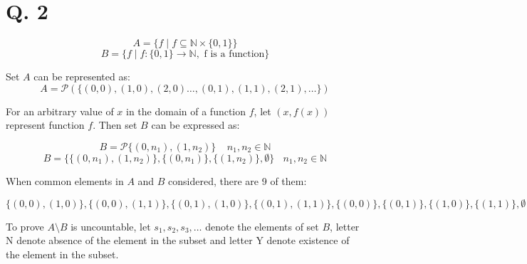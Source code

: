 \documentclass[11pt]{article}
\begin{document}
	\section*{Q. 2}
	\begin{equation*}
		A=\{f \mid f \subseteq  \mathbb{N} \times \{0,1 \} \}
	\end{equation*}
	\begin{equation*}
		B=\{f \mid f :  \{0,1 \} \rightarrow \mathbb{N}, \text{ f is a function} \}
	\end{equation*}

	Set $A$ can be represented as:
	\begin{equation*}
		A=\mathcal{P} (\{ (0, 0), (1, 0), (2,0) \dots, (0, 1), (1, 1), (2,1), \dots \})
	\end{equation*}

	For an arbitrary value of $x$ in the domain of a function $f$, let $(x, f(x))$ represent function $f$. Then set $B$ can be expressed as:
	
	\begin{equation*}
		B=\mathcal{P}\{ (0, n_1), (1, n_2)\} \ \ \ \ \ \text{$n_1, n_2 \in \mathbb{N}$}
	\end{equation*} 
	\begin{equation*}
		B=\{\{ (0, n_1), (1, n_2) \}, \{ (0, n_1) \}, \{ (1, n_2) \}, \emptyset \} \ \ \ \ \text{$n_1, n_2 \in \mathbb{N}$} 
	\end{equation*}

	When common elements in $A$ and $B$ considered, there are 9 of them:
	
	\begin{equation*}
		\{(0,0), (1, 0)\}, \{(0,0), (1, 1)\}, \{(0,1), (1, 0)\}, \{(0,1), (1, 1)\},
		\{(0,0)\}, \{(0,1)\}, \{(1,0)\}, \{(1,1)\}, \emptyset
	\end{equation*}
	
	To prove $A \setminus B$ is uncountable, let $s_1, s_2, s_3, \dots$ denote the elements of set $B$, letter N denote absence of the element in the subset and letter Y denote existence of the element in the subset. 
	
\end{document}
